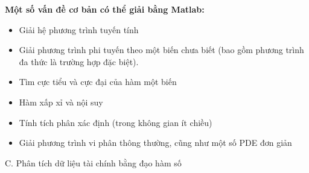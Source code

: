 \documentclass[12pt,a4paper]{report}
\begin{document}
\textbf{Một số vấn đề cơ bản có thể giải bằng Matlab:}
\begin{itemize}
    \item Giải hệ phương trình tuyến tính
    \item Giải phương trình phi tuyến theo một biến chưa biết (bao gồm phương trình đa thức là trường hợp đặc biệt).
    \item Tìm cực tiểu và cực đại của hàm một biến
    \item Hàm xấp xỉ và nội suy
    \item Tính tích phân xác định (trong không gian ít chiều)
    \item Giải phương trình vi phân thông thường, cũng như một số PDE đơn giản
\end{itemize}
\newpage
\begin{center}
    \LARGE C. Phân tích dữ liệu tài chính bằng đạo hàm số
\end{center}
\end{document}
